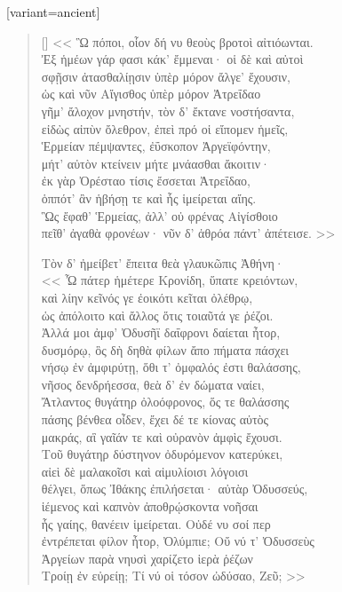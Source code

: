 \documentclass[10pt]{lecturenotes}
\begin{document}
\begin{greek}[variant=ancient]
\begin{verse}[\versewidth]
<< Ὣ πόποι, οἷον δή νυ θεοὺς βροτοὶ αἰτιόωνται.\\
Ἐξ ἡμέων γάρ φασι κάκ' ἔμμεναι· οἱ δὲ καὶ αὐτοὶ\\
σφῇσιν ἀτασθαλίῃσιν ὑπὲρ μόρον ἄλγε' ἔχουσιν,\\
ὡς καὶ νῦν Αἴγισθος ὑπὲρ μόρον Ἀτρεΐδαο \\
γῆμ' ἄλοχον μνηστήν, τὸν δ' ἔκτανε νοστήσαντα,\\
εἰδὼς αἰπὺν ὄλεθρον, ἐπεὶ πρό οἱ εἴπομεν ἡμεῖς,\\
Ἑρμείαν πέμψαντες, ἐΰσκοπον Ἀργεϊφόντην,\\
μήτ' αὐτὸν κτείνειν μήτε μνάασθαι ἄκοιτιν·\\
ἐκ γὰρ Ὀρέσταο τίσις ἔσσεται Ἀτρεΐδαο, \\
ὁππότ' ἂν ἡβήσῃ τε καὶ ἧς ἱμείρεται αἴης.\\
Ὣς ἔφαθ' Ἑρμείας, ἀλλ' οὐ φρένας Αἰγίσθοιο\\
πεῖθ' ἀγαθὰ φρονέων· νῦν δ' ἁθρόα πάντ' ἀπέτεισε. >>

Τὸν δ' ἠμείβετ' ἔπειτα θεὰ γλαυκῶπις Ἀθήνη·       \\
<< Ὦ πάτερ ἡμέτερε Κρονίδη, ὕπατε κρειόντων, \\
καὶ λίην κεῖνός γε ἐοικότι κεῖται ὀλέθρῳ,\\
ὡς ἀπόλοιτο καὶ ἄλλος ὅτις τοιαῦτά γε ῥέζοι.\\
Ἀλλά μοι ἀμφ' Ὀδυσῆϊ δαΐφρονι δαίεται ἦτορ,\\
δυσμόρῳ, ὃς δὴ δηθὰ φίλων ἄπο πήματα πάσχει\\
νήσῳ ἐν ἀμφιρύτῃ, ὅθι τ' ὀμφαλός ἐστι θαλάσσης,\\ 
νῆσος δενδρήεσσα, θεὰ δ' ἐν δώματα ναίει,\\
Ἄτλαντος θυγάτηρ ὀλοόφρονος, ὅς τε θαλάσσης\\
πάσης βένθεα οἶδεν, ἔχει δέ τε κίονας αὐτὸς\\
μακράς, αἳ γαῖάν τε καὶ οὐρανὸν ἀμφὶς ἔχουσι.\\
Τοῦ θυγάτηρ δύστηνον ὀδυρόμενον κατερύκει, \\
αἰεὶ δὲ μαλακοῖσι καὶ αἱμυλίοισι λόγοισι\\
θέλγει, ὅπως Ἰθάκης ἐπιλήσεται· αὐτὰρ Ὀδυσσεύς,\\
ἱέμενος καὶ καπνὸν ἀποθρῴσκοντα νοῆσαι\\
ἧς γαίης, θανέειν ἱμείρεται. Οὐδέ νυ σοί περ\\
ἐντρέπεται φίλον ἦτορ, Ὀλύμπιε; Οὔ νύ τ' Ὀδυσσεὺς \\
Ἀργείων παρὰ νηυσὶ χαρίζετο ἱερὰ ῥέζων\\
Τροίῃ ἐν εὐρείῃ; Τί νύ οἱ τόσον ὠδύσαο, Ζεῦ; >>
\end{verse}
\end{greek}
\pagebreak
\end{document}
